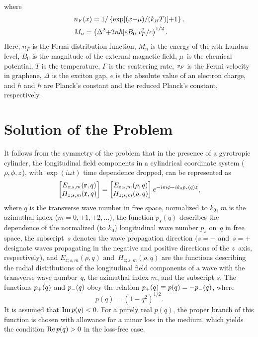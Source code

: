 \documentclass[conference,a4paper]{IEEEtran}
\begin{document}
where
\begin{align}
&{n_F}(x) = 1/\left\{\exp [(x{-}\mu )/({k_B}T)]{+}1\right\},\nonumber\\
&{M_n} = \left({\Delta ^2}{+}2n\hbar |e{B_0}|{\it v}_F^{\rm{2}}{\rm{/}}c\right)^{1/2}\nonumber.
\end{align}
Here, $n_F$ is the Fermi distribution function, $M_n$ is the energy of the $n$th Landau level, $B_0$ is the magnitude of the external magnetic field, $\mu$~is the chemical potential, $T$ is the temperature, $\Gamma$ is the scattering rate, ${\it v}_F$ is the Fermi velocity in graphene, $\Delta$ is the exciton gap, $e$ is the absolute value of an electron charge, and $h$ and $\hbar$ are Planck's constant and the reduced Planck's constant, respectively.


\section{Solution of the Problem}

It follows from the symmetry of the problem that in the presence of a gyrotropic cylinder, the longitudinal field components in a cylindrical coordinate system ($\rho,\phi,z$), with $\exp({i}\omega t)$ time dependence dropped, can be represented as
\begin{equation}\label{eq5}
\begin{bmatrix} {E}_{z;s,m}({\bf r},q)\\ {	H}_{z;s,m}({\bf r},q)\end{bmatrix} = \begin{bmatrix} {E}_{z;s,m}(\rho, q)\\ {H}_{z;s,m}(\rho, q)\end{bmatrix}e^{-i m\phi - i k_0
	p_{s}(q)z},
\end{equation}
where $q$ is the transverse wave number in free space, normalized to $k_0$, $m$ is the azimuthal index ($m=0, \pm 1, \pm 2, ...$), the function $p_{s}(q)$ describes the dependence of the normalized (to $k_0$) longitudinal wave number $p_s$ on~$q$ in free space, the subscript~$s$ denotes the wave propagation
direction ($s=-$ and~$s=+$ designate waves propagating in the negative and positive directions of the $z$~axis, respectively), and ${E}_{z;s,m}(\rho, q)$ and~${H}_{z;s,m}(\rho, q)$ are
the functions describing the radial distributions of the longitudinal field components of a wave with the transverse wave number~$q$, the azimuthal index $m$, and the subscript $s$. The functions $p_{\rm +}(q)$ and $p_{\rm -}(q)$ obey the
relation $p_{\rm +}(q)\equiv p(q)= -p_{\rm -}(q)$, where
\begin{equation}\label{eq6}
p(q)=\left(1-q^2\right)^{1/2}.
\end{equation}
It is assumed that ${\rm Im}\,p(q)<0$. For a purely real $p(q)$, the proper branch of this function is chosen with allowance for a minor loss in the medium, which yields the condition ${\rm Re}\,p(q)>0$ in the loss-free case.
\end{document}
